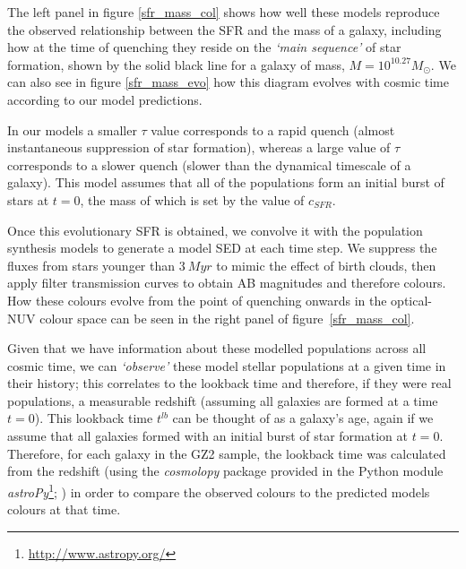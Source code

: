 \documentclass{mn2e}
\begin{document}
The left panel in figure \ref{sfr_mass_col} shows how well these models reproduce the observed relationship between the SFR and the mass of a galaxy, including how at the time of quenching they reside on the \emph{`main sequence'} of star formation, shown by the solid black line for a galaxy of mass, $M = 10^{10.27} M_{\odot}$.  We can also see in figure \ref{sfr_mass_evo} how this diagram evolves with cosmic time according to our model predictions. 



In our models a smaller $\tau$ value corresponds to a rapid quench (almost instantaneous suppression of star formation), whereas a large value of $\tau$ corresponds to a slower quench (slower than the dynamical timescale of a galaxy).  This model assumes that all of the populations form an initial burst of stars at $t=0$, the mass of which is set by the value of $c_{SFR}$. %

Once this evolutionary SFR is obtained, we convolve it with the \citet{BC03} population synthesis models to generate a model SED at each time step. We suppress the fluxes from stars younger than $3~Myr$ to mimic the effect of birth clouds, then apply filter transmission curves to obtain AB magnitudes and therefore colours. How these colours evolve from the point of quenching onwards in the optical-NUV colour space can be seen in the right panel of figure~\ref{sfr_mass_col}.



Given that we have information about these modelled populations across all cosmic time, we can \emph{`observe'} these model stellar populations at a given time in their history; this correlates to the lookback time and therefore, if they were real populations, a measurable redshift (assuming all galaxies are formed at a time $t=0$). This lookback time $t^{lb}$ can be thought of as a galaxy's age, again if we assume that all galaxies formed with an initial burst of star formation at $t=0$. Therefore, for each galaxy in the GZ2 sample, the lookback time was calculated from the redshift (using the \emph{cosmolopy} package provided in the Python module \emph{astroPy}\footnote{\url{http://www.astropy.org/}}; \citealt{Rob13}) in order to compare the observed colours to the predicted models colours at that time. 
\end{document}
